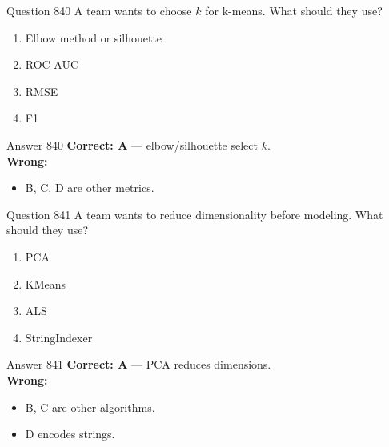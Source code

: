 \documentclass[aspectratio=169,11pt]{beamer}
\begin{document}
	\begin{frame}{Question 840}
		A team wants to choose $k$ for k-means. What should they use?
		\begin{enumerate}[label=\Alph*.]
			\item Elbow method or silhouette
			\item ROC-AUC
			\item RMSE
			\item F1
		\end{enumerate}
	\end{frame}
	\begin{frame}{Answer 840}
		\textbf{Correct: A} --- elbow/silhouette select $k$.\\
		\vspace{0.5em}
		\textbf{Wrong:}
		\begin{itemize}
			\item B, C, D are other metrics.
		\end{itemize}
	\end{frame}
	
	\begin{frame}{Question 841}
		A team wants to reduce dimensionality before modeling. What should they use?
		\begin{enumerate}[label=\Alph*.]
			\item PCA
			\item KMeans
			\item ALS
			\item StringIndexer
		\end{enumerate}
	\end{frame}
	\begin{frame}{Answer 841}
		\textbf{Correct: A} --- PCA reduces dimensions.\\
		\vspace{0.5em}
		\textbf{Wrong:}
		\begin{itemize}
			\item B, C are other algorithms.
			\item D encodes strings.
		\end{itemize}
	\end{frame}
	
\end{document}
